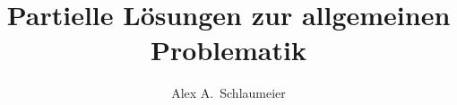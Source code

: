 \documentclass[master,german,smartquotes]{hgbthesis}
\title{Partielle Lösungen zur allgemeinen Problematik}
\author{Alex A.\ Schlaumeier}
\begin{document}

\frontmatter                    %

\maketitle
\tableofcontents

		
			

\mainmatter          %










\appendix                                            %


\backmatter       %

\MakeBibliography       %




\end{document}
